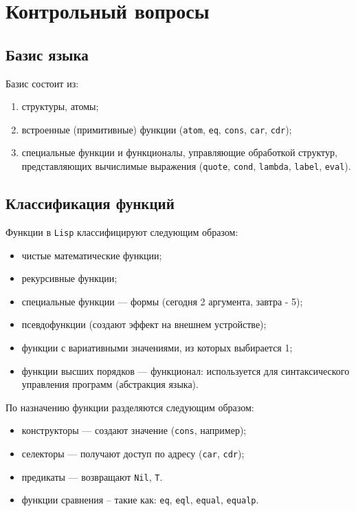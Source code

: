 \chapter{Контрольный вопросы}

\section{Базис языка}

Базис состоит из:
\begin{enumerate}
    \item структуры, атомы;
    \item встроенные (примитивные) функции (\texttt{atom}, \texttt{eq}, \texttt{cons}, \texttt{car}, \texttt{cdr});
    \item специальные функции и функционалы, управляющие обработкой структур, представляющих вычислимые выражения (\texttt{quote}, \texttt{cond}, \texttt{lambda}, \texttt{label}, \texttt{eval}).
\end{enumerate}

\section{Классификация функций}

Функции в \texttt{Lisp} классифицируют следующим образом:

\begin{itemize}
    \item чистые математические функции;
    \item рекурсивные функции;
    \item специальные функции --- формы (сегодня 2 аргумента, завтра - 5);
    \item псевдофункции (создают эффект на внешнем устройстве);
    \item функции с вариативными значениями, из которых выбирается 1;
    \item функции высших порядков --- функционал: используется для синтаксического управления программ (абстракция языка).
\end{itemize}

По назначению функции разделяются следующим образом:

\begin{itemize}
    \item конструкторы --- создают значение (\texttt{cons}, например);
    \item селекторы --- получают доступ по адресу (\texttt{car}, \texttt{cdr});
    \item предикаты --- возвращают \texttt{Nil}, \texttt{T}.
    \item функции сравнения -- такие как: \texttt{eq}, \texttt{eql}, \texttt{equal}, \texttt{equalp}.
\end{itemize}

